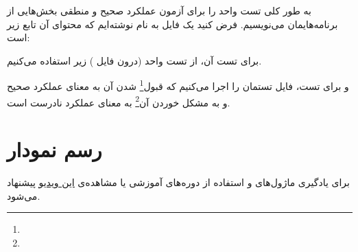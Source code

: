 به طور کلی تست واحد را برای آزمون عملکرد صحیح و منطقی بخش‌هایی از برنامه‌هایمان می‌نویسیم. فرض کنید یک فایل به نام  نوشته‌ایم که محتوای آن تابع زیر است:



برای تست آن، از تست واحد (درون فایل ) زیر استفاده می‌کنیم.


و برای تست، فایل تستمان را اجرا می‌کنیم
که قبول\footnote{} شدن آن به معنای عملکرد صحیح و به مشکل خوردن آن\footnote{} به معنای عملکرد نادرست است.


\section{رسم نمودار}

برای یادگیری ماژول‌های  و  استفاده از دوره‌های آموزشی \href{https://www.kaggle.com}{\underline{}} یا مشاهده‌‌ی \href{https://www.youtube.com/watch?v=LnGz20B3nTU}{\underline{این ویدیو}} پیشنهاد می‌شود.